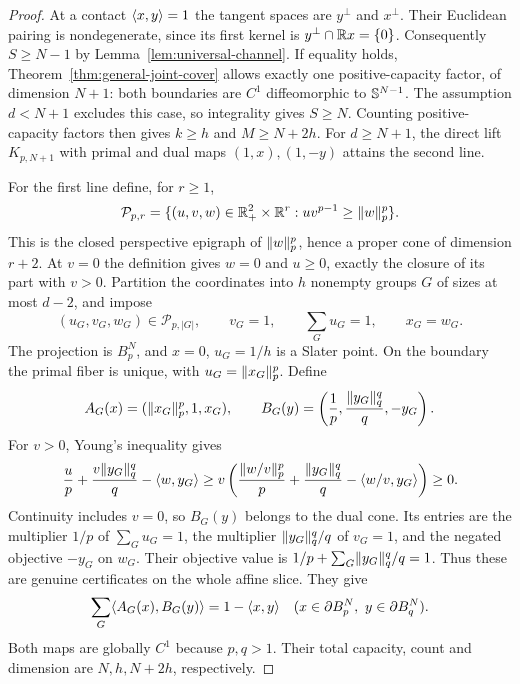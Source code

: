\begin{proof}
At a contact $\langle x,y\rangle=1$ the tangent spaces are $y^\perp$ and
$x^\perp$. Their Euclidean pairing is nondegenerate, since its first
kernel is $y^\perp\cap\mathbb R x=\{0\}$. Consequently $S\geq N-1$ by
Lemma~\ref{lem:universal-channel}. If equality holds,
Theorem~\ref{thm:general-joint-cover} allows exactly one positive-capacity
factor, of dimension $N+1$: both boundaries are $C^1$ diffeomorphic to
$\mathbb S^{N-1}$. The assumption $d<N+1$ excludes this case, so integrality gives
$S\geq N$. Counting positive-capacity factors then gives $k\geq h$
and $M\geq N+2h$. For $d\geq N+1$, the direct lift $K_{p,N+1}$ with
primal and dual maps $(1,x),(1,-y)$ attains the second line.

For the first line define, for $r\geq1$,
\begin{equation}\label{eq:grouped-p-cone}
 \mathcal P_{p,r}
 =\{(u,v,w)\in\mathbb R_+^2\times\mathbb R^r:
                uv^{p-1}\geq\lVert w\rVert_p^p\}.
\end{equation}
This is the closed perspective epigraph of $\lVert w\rVert_p^p$, hence a
proper cone of dimension $r+2$. At $v=0$ the definition gives $w=0$
and $u\geq0$, exactly the closure of its part with $v>0$.
Partition the coordinates into $h$ nonempty groups $G$ of sizes at most
$d-2$, and impose
\begin{equation}\label{eq:grouped-p-lift}
 (u_G,v_G,w_G)\in\mathcal P_{p,|G|},\qquad
 v_G=1,\qquad \sum_Gu_G=1,\qquad x_G=w_G.
\end{equation}
The projection is $B_p^N$, and $x=0$, $u_G=1/h$ is a Slater point.
On the boundary the primal fiber is unique, with $u_G=\lVert x_G\rVert_p^p$.
Define
\begin{equation}\label{eq:young-group-factors}
 A_G(x)=(\lVert x_G\rVert_p^p,1,x_G),\qquad
 B_G(y)=\left(\frac1p,\frac{\lVert y_G\rVert_q^q}{q},-y_G\right).
\end{equation}
For $v>0$, Young's inequality gives
\[
 \frac{u}{p}+\frac{v\lVert y_G\rVert_q^q}{q}-\langle w,y_G\rangle
 \geq v\left(\frac{\lVert w/v\rVert_p^p}{p}
             +\frac{\lVert y_G\rVert_q^q}{q}-\langle w/v,y_G\rangle\right)\geq0.
\]
Continuity includes $v=0$, so $B_G(y)$ belongs to the dual cone.
Its entries are the multiplier $1/p$ of $\sum_Gu_G=1$, the
multiplier $\lVert y_G\rVert_q^q/q$ of $v_G=1$, and the negated objective
$-y_G$ on $w_G$.
Their objective value is $1/p+\sum_G\lVert y_G\rVert_q^q/q=1$.
Thus these are genuine certificates on the whole affine slice.
They give
\[
 \sum_G\langle A_G(x),B_G(y)\rangle=1-\langle x,y\rangle
 \quad(x\in\partial B_p^N,\ y\in\partial B_q^N).
\]
Both maps are globally $C^1$ because $p,q>1$. Their total capacity,
count and dimension are $N,h,N+2h$, respectively.
\end{proof}

